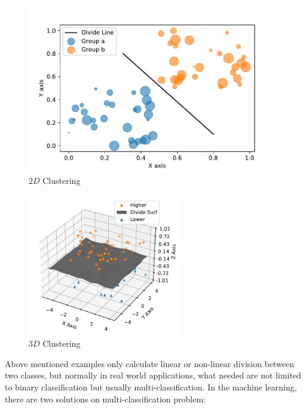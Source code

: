 \begin{spacing}{1.5}
\begin{figure}[ht]
\centering
\includegraphics[width=0.99\textwidth, fbox]{Chapter2/2dcluster.pdf}
\caption{$2D$ Clustering}
\label{fig:2dcluster} 
\end{figure}

% 

\begin{figure}[ht]
\centering
\includegraphics[width=0.6\textwidth, fbox]{Chapter2/3dcluster.pdf}
\caption{$3D$ Clustering}
\label{fig:3dcluster} 
\end{figure}

Above mentioned examples only calculate linear or non-linear division between two classes, but normally in real world applications, what needed are not limited to binary classification but usually multi-classification. In the machine learning, there are two solutions on multi-classification problem: 


\end{spacing}
